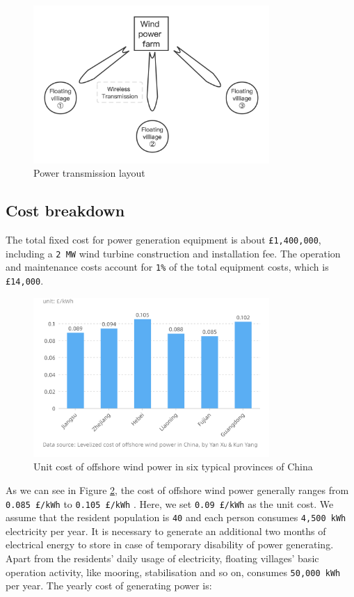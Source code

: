 \documentclass[11pt]{article}
\numberwithin{equation}{section}
\begin{document}
\begin{figure}[H]
\centering
\includegraphics[width=0.8\textwidth]{Figures/powerTransmission.png}
\caption{\label{powerTransmission}Power transmission layout}
\end{figure}

\subsection{Cost breakdown}
\label{sec:org75a2940}
The total fixed cost for power generation equipment is about \texttt{£1,400,000}, including a \texttt{2 MW} wind turbine construction and installation fee. The operation and maintenance costs account for \texttt{1\%} of the total equipment costs, which is \texttt{£14,000}.

\begin{figure}[H]
\centering
\includegraphics[width=0.8\textwidth]{Figures/powerGenerationCost.png}
\caption{\label{powerGenerationCost}Unit cost of offshore wind power in six typical provinces of China}
\end{figure}

As we can see in Figure \ref{powerGenerationCost}, the cost of offshore wind power generally ranges from \texttt{0.085 £/kWh} to \texttt{0.105 £/kWh} \cite{10.1016/j.ijepes.2021.107273}. Here, we set \texttt{0.09 £/kWh} as the unit cost. We assume that the resident population is \texttt{40} and each person consumes \texttt{4,500 kWh} electricity per year. It is necessary to generate an additional two months of electrical energy to store in case of temporary disability of power generating. Apart from the residents’ daily usage of electricity, floating villages’ basic operation activity, like mooring, stabilisation and so on, consumes \texttt{50,000 kWh} per year.   The yearly cost of generating power is:
\end{document}
